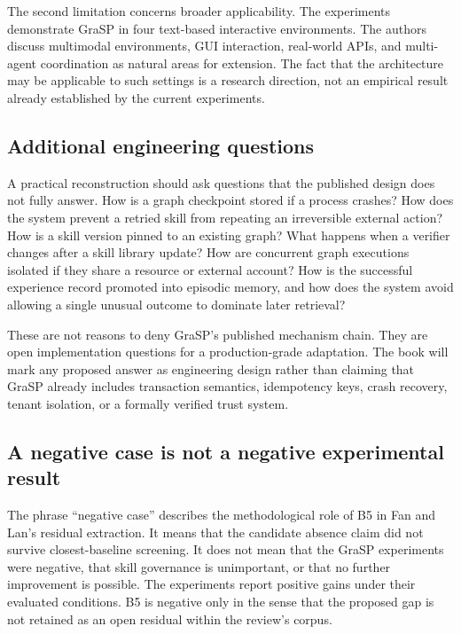 The second limitation concerns broader applicability. The experiments demonstrate GraSP in four text-based interactive environments. The authors discuss multimodal environments, GUI interaction, real-world APIs, and multi-agent coordination as natural areas for extension. The fact that the architecture may be applicable to such settings is a research direction, not an empirical result already established by the current experiments.\autocite{xia2026grasp}

\subsection{Additional engineering questions}

A practical reconstruction should ask questions that the published design does not fully answer. How is a graph checkpoint stored if a process crashes? How does the system prevent a retried skill from repeating an irreversible external action? How is a skill version pinned to an existing graph? What happens when a verifier changes after a skill library update? How are concurrent graph executions isolated if they share a resource or external account? How is the successful experience record promoted into episodic memory, and how does the system avoid allowing a single unusual outcome to dominate later retrieval?

These are not reasons to deny GraSP's published mechanism chain. They are open implementation questions for a production-grade adaptation. The book will mark any proposed answer as engineering design rather than claiming that GraSP already includes transaction semantics, idempotency keys, crash recovery, tenant isolation, or a formally verified trust system.

\subsection{A negative case is not a negative experimental result}

The phrase “negative case” describes the methodological role of B5 in Fan and Lan's residual extraction. It means that the candidate absence claim did not survive closest-baseline screening. It does not mean that the GraSP experiments were negative, that skill governance is unimportant, or that no further improvement is possible. The experiments report positive gains under their evaluated conditions. B5 is negative only in the sense that the proposed gap is not retained as an open residual within the review's corpus.

